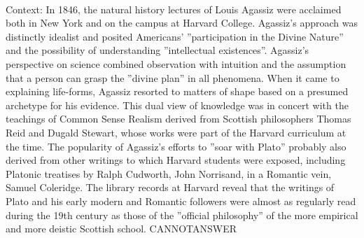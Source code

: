 \documentclass[11pt,a4paper, onecolumn]{article}
\begin{document}
\\ Context: In 1846, the natural history lectures of Louis Agassiz were acclaimed both in New York and on the campus at Harvard College. Agassiz's approach was distinctly idealist and posited Americans' ''participation in the Divine Nature'' and the possibility of understanding ''intellectual existences''. Agassiz's perspective on science combined observation with intuition and the assumption that a person can grasp the ''divine plan'' in all phenomena. When it came to explaining life-forms, Agassiz resorted to matters of shape based on a presumed archetype for his evidence. This dual view of knowledge was in concert with the teachings of Common Sense Realism derived from Scottish philosophers Thomas Reid and Dugald Stewart, whose works were part of the Harvard curriculum at the time. The popularity of Agassiz's efforts to ''soar with Plato'' probably also derived from other writings to which Harvard students were exposed, including Platonic treatises by Ralph Cudworth, John Norrisand, in a Romantic vein, Samuel Coleridge. The library records at Harvard reveal that the writings of Plato and his early modern and Romantic followers were almost as regularly read during the 19th century as those of the ''official philosophy'' of the more empirical and more deistic Scottish school. CANNOTANSWER
\end{document}
